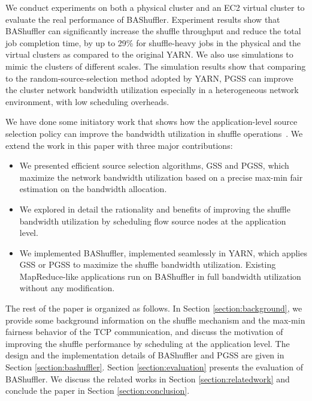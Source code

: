 \documentclass[10pt,journal,compsoc]{IEEEtran}
\begin{document}
We conduct experiments on both a physical cluster and an EC2
virtual cluster to evaluate the real performance of BAShuffler. 
Experiment results show that BAShuffler can significantly increase the
shuffle throughput
and reduce the total job completion time, by up to 29\% for
shuffle-heavy jobs in the physical and the virtual clusters
as compared to the original YARN. 
We also use simulations to mimic the clusters of different scales. 
The simulation results show that comparing to the
random-source-selection method adopted by YARN, 
PGSS can improve the cluster network bandwidth
utilization especially in a heterogeneous network environment, with low scheduling overheads.

We have done some initiatory work that shows how the application-level source selection policy can improve the bandwidth utilization in shuffle operations~\cite{Liang:2016:BMN}. We extend the work in this paper with three major contributions:
\begin{itemize}
\setlength{\itemsep}{0pt}
\setlength{\parskip}{0pt}
\setlength{\parsep}{0pt}
\item We presented efficient source selection algorithms, GSS and PGSS,
which maximize the network bandwidth utilization based on a precise 
max-min fair estimation on the bandwidth allocation. 

\item We 
explored in detail the rationality and benefits 
of improving the shuffle bandwidth utilization by scheduling flow source nodes at the application level.



\item We implemented BAShuffler, implemented seamlessly in YARN,  
which applies GSS or PGSS to maximize the shuffle bandwidth utilization. 
Existing MapReduce-like applications run on BAShuffler in full bandwidth utilization without any modification.

\end{itemize}


The rest of the paper is organized as follows.
In Section \ref{section:background}, we provide some background information on the shuffle mechanism
and the max-min fairness behavior of the TCP communication, and discuss the motivation of improving the shuffle performance by scheduling at the application level.
The design and the implementation details of BAShuffler and PGSS
are given in Section \ref{section:bashuffler}.
Section \ref{section:evaluation} presents the evaluation of BAShuffler.
We discuss the related works in Section \ref{section:relatedwork} and
conclude the paper in Section \ref{section:conclusion}. 
\end{document}

